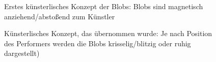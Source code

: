 \FloatBarrier
\begin{figure}[htbp]
    \centering
    \caption{Erstes künsterlisches Konzept der Blobs: Blobs sind magnetisch anziehend/abstoßend zum Künstler}
    \label{fig:scaling_concept}
\end{figure}

\begin{figure}[htbp]
    \centering
    \caption{Künsterlisches Konzept, das übernommen wurde: Je nach Position des Performers werden die Blobs krisselig/blitzig oder ruhig dargestellt)}
    \label{fig:external_positioning}
\end{figure}


